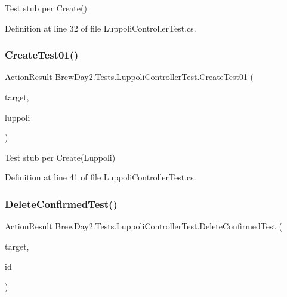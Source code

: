 Test stub per Create()



Definition at line 32 of file Luppoli\+Controller\+Test.\+cs.

\mbox{\label{class_brew_day2_1_1_tests_1_1_luppoli_controller_test_a5bb048805f9c0b5c0dec59410a14f13c}} 
\subsubsection{\texorpdfstring{Create\+Test01()}{CreateTest01()}}
{\footnotesize\ttfamily Action\+Result Brew\+Day2.\+Tests.\+Luppoli\+Controller\+Test.\+Create\+Test01 (\begin{DoxyParamCaption}\item[{\mbox{[}\+Pex\+Assume\+Under\+Test\mbox{]} \mbox{\hyperlink{class_brew_day2_1_1_controllers_1_1_luppoli_controller}{Luppoli\+Controller}}}]{target,  }\item[{\mbox{\hyperlink{class_brew_day2_1_1_models_1_1_luppoli}{Luppoli}}}]{luppoli }\end{DoxyParamCaption})}



Test stub per Create(\+Luppoli)



Definition at line 41 of file Luppoli\+Controller\+Test.\+cs.

\mbox{\label{class_brew_day2_1_1_tests_1_1_luppoli_controller_test_abe54743b31854f4413b01d5f3587ae97}} 
\subsubsection{\texorpdfstring{Delete\+Confirmed\+Test()}{DeleteConfirmedTest()}}
{\footnotesize\ttfamily Action\+Result Brew\+Day2.\+Tests.\+Luppoli\+Controller\+Test.\+Delete\+Confirmed\+Test (\begin{DoxyParamCaption}\item[{\mbox{[}\+Pex\+Assume\+Under\+Test\mbox{]} \mbox{\hyperlink{class_brew_day2_1_1_controllers_1_1_luppoli_controller}{Luppoli\+Controller}}}]{target,  }\item[{int}]{id }\end{DoxyParamCaption})}



